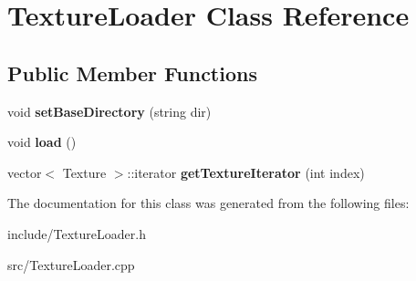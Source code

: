 \hypertarget{class_texture_loader}{}\section{Texture\+Loader Class Reference}
\label{class_texture_loader}
\subsection*{Public Member Functions}
\begin{DoxyCompactItemize}
\item 
\hypertarget{class_texture_loader_a8c6ef2773da422d2b40a98e839c0ccf8}{}void {\bfseries set\+Base\+Directory} (string dir)\label{class_texture_loader_a8c6ef2773da422d2b40a98e839c0ccf8}

\item 
\hypertarget{class_texture_loader_a887d3fd9f794498a8273f65d994e9250}{}void {\bfseries load} ()\label{class_texture_loader_a887d3fd9f794498a8273f65d994e9250}

\item 
\hypertarget{class_texture_loader_aa579911f752f74d993459639b326ed41}{}vector$<$ Texture $>$\+::iterator {\bfseries get\+Texture\+Iterator} (int index)\label{class_texture_loader_aa579911f752f74d993459639b326ed41}

\end{DoxyCompactItemize}


The documentation for this class was generated from the following files\+:\begin{DoxyCompactItemize}
\item 
include/Texture\+Loader.\+h\item 
src/Texture\+Loader.\+cpp\end{DoxyCompactItemize}
